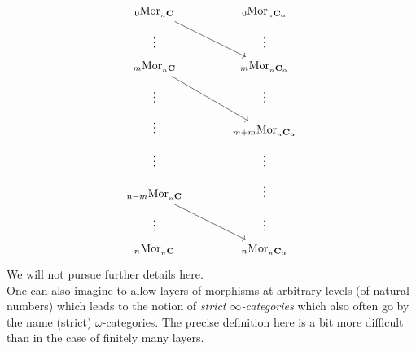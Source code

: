 \begin{equation*}
\begin{tikzcd}[row sep=tiny,column sep=large]
  {_{0}}\mathrm{Mor}_{{_{n}}\mathbf{C}}
  \arrow{rdd}{}
  &
  {_{0}}\mathrm{Mor}_{{_{n}}\mathbf{C}_{\alpha}}
  \\
  \vdots
  &
  \vdots
  \\
  {_{m}}\mathrm{Mor}_{{_{n}}\mathbf{C}}
  \arrow{rdd}{}
  &
  {_{m}}\mathrm{Mor}_{{_{n}}\mathbf{C}_{\alpha}}
  \\
  \vdots
  &
  \vdots
  \\
  \vdots
  &
  {_{m+m}}\mathrm{Mor}_{{_{n}}\mathbf{C}_{\alpha}}
  \\
  \vdots
  &
  \vdots
  \\
  {_{n-m}}\mathrm{Mor}_{{_{n}}\mathbf{C}}
  \arrow{rdd}{}
  &
  \vdots
  \\
  \vdots
  &
  \vdots
  \\
  {_{n}}\mathrm{Mor}_{{_{n}}\mathbf{C}}
  &
  {_{n}}\mathrm{Mor}_{{_{n}}\mathbf{C}_{\alpha}}
\end{tikzcd}
\end{equation*}
We will not pursue further details here.
\\
One can also imagine to allow layers of morphisms at arbitrary levels (of natural numbers) which leads to the notion of \textit{strict $\infty$-categories} which also often go by the name (strict) $\omega$-categories. The precise definition here is a bit more difficult than in the case of finitely many layers.
\\\\

